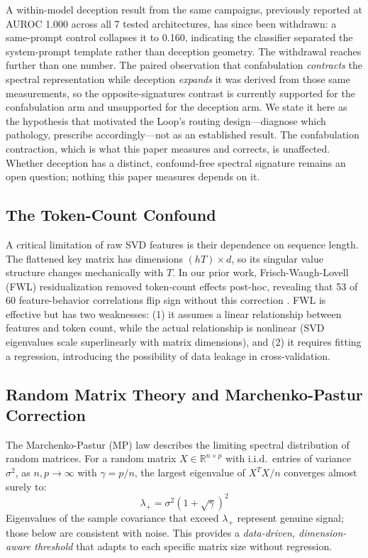 A within-model deception result from the same campaigns, previously
reported at AUROC 1.000 across all 7 tested architectures, has since been
withdrawn: a same-prompt control collapses it to 0.160, indicating the
classifier separated the system-prompt template rather than deception
geometry. The withdrawal reaches further than one number. The paired
observation that confabulation \emph{contracts} the spectral
representation while deception \emph{expands} it was derived from those
same measurements, so the opposite-signatures contrast is currently
supported for the confabulation arm and unsupported for the deception
arm. We state it here as the hypothesis that motivated the Loop's routing
design---diagnose which pathology, prescribe accordingly---not as an
established result. The confabulation contraction, which is what this
paper measures and corrects, is unaffected. Whether deception has a
distinct, confound-free spectral signature remains an open question;
nothing this paper measures depends on it.

\subsection{The Token-Count Confound}

A critical limitation of raw SVD features is their dependence on sequence
length. The flattened key matrix has dimensions $(hT) \times d$, so its
singular value structure changes mechanically with $T$. In our prior work,
Frisch-Waugh-Lovell (FWL) residualization \citep{frisch1933partial,lovell1963seasonal} removed token-count effects
post-hoc, revealing that 53 of 60 feature-behavior correlations flip sign
without this correction \citep{lyra2026detecting}. FWL is effective but has
two weaknesses: (1) it assumes a linear relationship between features and
token count, while the actual relationship is nonlinear (SVD eigenvalues
scale superlinearly with matrix dimensions), and (2) it requires fitting a
regression, introducing the possibility of data leakage in cross-validation.

\subsection{Random Matrix Theory and Marchenko-Pastur Correction}

The Marchenko-Pastur (MP) law \citep{marchenko1967distribution} describes
the limiting spectral distribution of random matrices. For a random matrix
$X \in \mathbb{R}^{n \times p}$ with i.i.d.\ entries of variance
$\sigma^2$, as $n, p \to \infty$ with $\gamma = p/n$, the largest
eigenvalue of $X^T X / n$ converges almost surely to:
\begin{equation}\label{eq:mp_threshold}
  \lambda_+ = \sigma^2 (1 + \sqrt{\gamma})^2
\end{equation}
Eigenvalues of the sample covariance that exceed $\lambda_+$ represent
genuine signal; those below are consistent with noise. This provides a
\emph{data-driven, dimension-aware threshold} that adapts to each specific
matrix size without regression.

